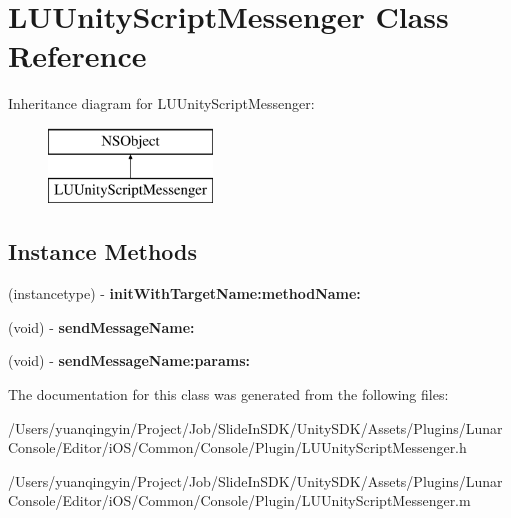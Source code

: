 \hypertarget{interface_l_u_unity_script_messenger}{}\section{L\+U\+Unity\+Script\+Messenger Class Reference}
\label{interface_l_u_unity_script_messenger}
Inheritance diagram for L\+U\+Unity\+Script\+Messenger\+:\begin{figure}[H]
\begin{center}
\leavevmode
\includegraphics[height=2.000000cm]{interface_l_u_unity_script_messenger}
\end{center}
\end{figure}
\subsection*{Instance Methods}
\begin{DoxyCompactItemize}
\item 
\mbox{\label{interface_l_u_unity_script_messenger_adbf1f311e4d26a482877a8deb81cd865}} 
(instancetype) -\/ {\bfseries init\+With\+Target\+Name\+:method\+Name\+:}
\item 
\mbox{\label{interface_l_u_unity_script_messenger_a4ef43e63cd20804a3f09393f0dd27dcf}} 
(void) -\/ {\bfseries send\+Message\+Name\+:}
\item 
\mbox{\label{interface_l_u_unity_script_messenger_a5f3ec94717c284bf46348931dd17c8d6}} 
(void) -\/ {\bfseries send\+Message\+Name\+:params\+:}
\end{DoxyCompactItemize}


The documentation for this class was generated from the following files\+:\begin{DoxyCompactItemize}
\item 
/\+Users/yuanqingyin/\+Project/\+Job/\+Slide\+In\+S\+D\+K/\+Unity\+S\+D\+K/\+Assets/\+Plugins/\+Lunar\+Console/\+Editor/i\+O\+S/\+Common/\+Console/\+Plugin/L\+U\+Unity\+Script\+Messenger.\+h\item 
/\+Users/yuanqingyin/\+Project/\+Job/\+Slide\+In\+S\+D\+K/\+Unity\+S\+D\+K/\+Assets/\+Plugins/\+Lunar\+Console/\+Editor/i\+O\+S/\+Common/\+Console/\+Plugin/L\+U\+Unity\+Script\+Messenger.\+m\end{DoxyCompactItemize}
